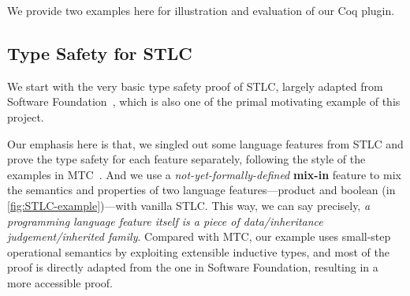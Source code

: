 We provide two examples here for illustration and evaluation of our Coq plugin. 

\subsection{Type Safety for STLC}
We start with the very basic type safety proof of STLC, largely adapted
from Software Foundation~\cite{pierce2014software}, which is also one of
the primal motivating example of this project. 

Our emphasis here is that, we singled out some language features from
STLC and prove the type safety for each feature separately, following
the style of the examples in MTC~\cite{delaware2013,forsta2020}.
And we use a \textit{not-yet-formally-defined} \textbf{mix-in} feature
to mix the semantics and properties of two language features---product
and boolean (in \cref{fig:STLC-example})---with vanilla STLC. This way,
we can say precisely, \textit{a programming language feature itself is a
piece of data/inheritance judgement/inherited family}. Compared with MTC,
our example uses small-step operational semantics by exploiting
extensible inductive types, and most of the proof is directly adapted
from the one in Software Foundation, resulting in a more accessible proof.

